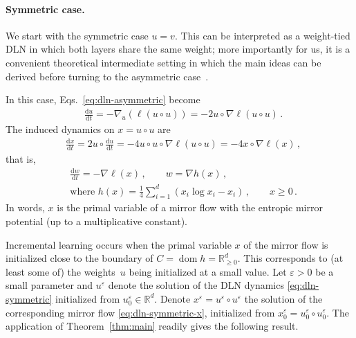 \documentclass[11pt,english,reqno]{article}
\DeclareMathOperator{\dom}{dom}
\newcommand{\diff}{\mathrm{d}}
\newcommand{\R}{\mathbb{R}}
\renewcommand{\geq}{\geqslant}
\theoremstyle{plain}
\theoremstyle{definition}
\theoremstyle{remark}
\numberwithin{equation}{section}
\begin{document}
\paragraph{Symmetric case.} We start with the symmetric case $u = v$. This can be interpreted as a weight-tied DLN in which both layers share the same weight; more importantly for us, it is a convenient theoretical intermediate setting in which the main ideas can be derived before turning to the asymmetric case~\cite{berthier2025diagonal}.

In this case, Eqs.~\eqref{eq:dln-asymmetric} become
\begin{align}
	\label{eq:dln-symmetric}
	&\frac{\diff u}{\diff t} = - \nabla_u\left(\ell(u \circ u)\right) = -2 u \circ \nabla \ell(u \circ u) \, . 
\end{align}
The induced dynamics on $x = u \circ u$ are 
\begin{align}
	\label{eq:dln-symmetric-x}
	&\frac{\diff x}{\diff t} = 2 u \circ \frac{\diff u}{\diff t} = -4 u \circ u \circ \nabla \ell(u \circ u) = -4 x \circ \nabla \ell(x) \, ,
\end{align}
	that is,
\begin{align*}
	&\frac{\diff w}{\diff t} = - \nabla \ell(x) \, , \qquad w = \nabla h(x) \, , \\
	&\text{where } h(x) = \frac{1}{4} \sum_{i=1}^{d} (x_i \log x_i - x_i) \, , \qquad x \geq 0 \, .
\end{align*}
In words, $x$ is the primal variable of a mirror flow with the entropic mirror potential (up to a multiplicative constant).

Incremental learning occurs when the primal variable $x$ of the mirror flow is initialized close to the boundary of $C = \dom h = \R_{\geq 0}^d$. This corresponds to (at least some of) the weights~$u$ being initialized at a small value. Let $\varepsilon > 0$ be a small parameter and $u^\varepsilon$ denote the solution of the DLN dynamics \eqref{eq:dln-symmetric} initialized from $u^\varepsilon_0 \in \R^d$. Denote $x^\varepsilon = u^\varepsilon \circ u^\varepsilon$ the solution of the corresponding mirror flow \eqref{eq:dln-symmetric-x}, initialized from $x^\varepsilon_0 = u^\varepsilon_0 \circ u^\varepsilon_0$. The application of Theorem~\ref{thm:main} readily gives the following result.
\end{document}
